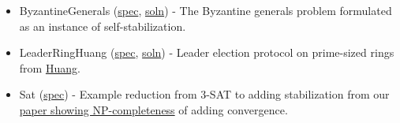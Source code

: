\begin{itemize}
\item ByzantineGenerals (\href{examplespec/ByzantineGenerals.prot}{spec}, \href{examplesoln/ByzantineGenerals.prot}{soln})
- The Byzantine generals problem formulated as an instance of self-stabilization.
\item LeaderRingHuang (\href{examplespec/LeaderRingHuang.prot}{spec}, \href{examplesoln/LeaderRingHuang.prot}{soln})
- Leader election protocol on prime-sized rings from \href{http://dx.doi.org/10.1145/169683.174161}{Huang}.
\item Sat (\href{examplespec/Sat.prot}{spec})
- Example reduction from 3-SAT to adding stabilization from our \href{http://dx.doi.org/10.1007/978-3-642-40213-5_2}{paper showing NP-completeness} of adding convergence.
\end{itemize}



